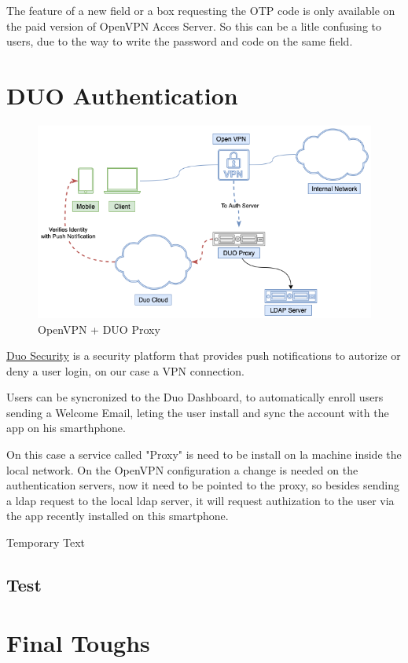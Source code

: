 The feature of a new field or a box requesting the OTP code is only available on the paid version of OpenVPN Acces Server.
So this can be a litle confusing to users, due to the way to write the password and code on the same field.




\newpage
\section{DUO Authentication}

\begin{figure}[!h]
  \centering
  \includegraphics[width=160mm]{images/DUO-Proxy.drawio.png}
  \caption{OpenVPN + DUO Proxy}
  \label{fig:label}
\end{figure}

\href{https://duo.com/}{Duo Security} is a security platform that provides push notifications to autorize or deny a user login, on our case a VPN connection.

Users can be syncronized to the Duo Dashboard, to automatically enroll users sending a Welcome Email, leting the user install and sync the account with the app on his smarthphone.

On this case a service called "Proxy" is need to be install on la machine inside the local network. On the OpenVPN configuration a change is needed on the authentication servers, now it need to be pointed to the proxy, so besides sending a ldap request to the local ldap server, it will request authization to the user via the app recently installed on this smartphone.

Temporary Text



\subsection{Test}


\newpage
\section{Final Toughs}
